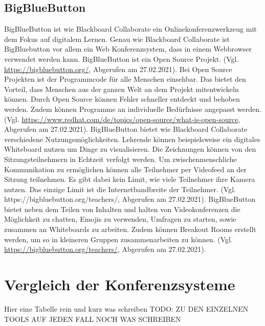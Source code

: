 \subsection{BigBlueButton}
BigBlueButton ist wie Blackboard Collaborate ein Onlinekonferenzwerkzeug mit dem Fokus auf digitalem Lernen. Genau wie Blackboard Collaborate ist BigBluebutton vor allem ein Web Konferenzsystem, dass in einem Webbrowser verwendet werden kann. BigBlueButton ist ein Open Source Projekt. (Vgl. \url{https://bigbluebutton.org/}, Abgerufen am 27.02.2021).
Bei Open Source Projekten ist der Programmcode für alle Menschen einsehbar. Das bietet den Vorteil, dass Menschen aus der ganzen Welt an dem Projekt mitentwickeln können. Durch Open Source können Fehler schneller entdeckt und behoben werden. Zudem können Programme an individuelle Bedürfnisse angepasst werden. (Vgl. \url{https://www.redhat.com/de/topics/open-source/what-is-open-source}, Abgerufen am 27.02.2021).
BigBlueButton bietet wie Blackboard Collaborate verschiedene Nutzungsmöglichkeiten. Lehrende können beispielsweise ein digitales Whiteboard nutzen um Dinge zu visualisieren. Die Zeichnungen können von den Sitzungsteilnehmern in Echtzeit verfolgt werden. Um zwischenmenschliche Kommunikation zu ermöglichen können alle Teilnehmer per Videofeed an der Sitzung teilnehmen. Es gibt dabei kein Limit, wie viele Teilnehmer ihre Kamera nutzen. Das einzige Limit ist die Internetbandbreite der Teilnehmer. (Vgl. https://bigbluebutton.org/teachers/, Abgerufen am 27.02.2021).
BigBlueButton bietet neben dem Teilen von Inhalten und halten von Videokonferenzen die Möglichkeit zu chatten, Emojis zu verwenden, Umfragen zu starten, sowie zusammen an Whiteboards zu arbeiten. Zudem können Breakout Rooms erstellt werden, um so in kleineren Gruppen zusammenarbeiten zu können. (Vgl. \url{https://bigbluebutton.org/teachers/}, Abgerufen am 27.02.2021).

\section{Vergleich der Konferenzsysteme}
Hier eine Tabelle rein und kurz was schreiben
TODO: ZU DEN EINZELNEN TOOLS AUF JEDEN FALL NOCH WAS SCHREIBEN